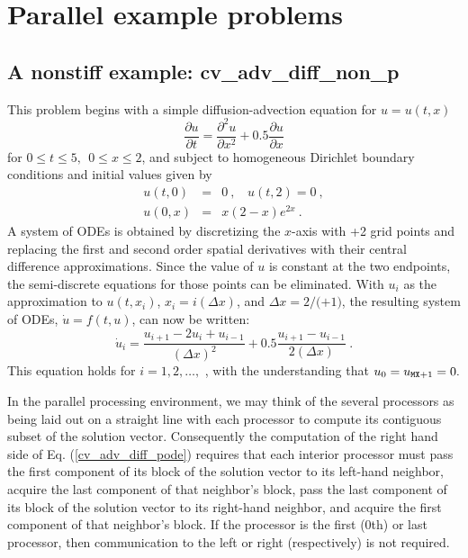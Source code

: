 \section{Parallel example problems}\label{s:ex_parallel}

\subsection{A nonstiff example: cv\_adv\_diff\_non\_p}\label{ss:cv_adv_diff_p}

This problem begins with a simple diffusion-advection equation
for $u=u(t,x)$
\begin{equation}
\frac{\partial u}{\partial t}=\frac{\partial ^{2}u}{\partial x^{2}}
   + 0.5\frac{\partial u}{\partial x}  \label{PDE1}
\end{equation}
for $0 \leq t \leq 5, ~~ 0\leq x \leq 2$, and subject to homogeneous
Dirichlet boundary conditions and initial values given by
\begin{eqnarray}
u(t,0) &=& 0 ~,~~~~u(t,2) = 0 ~, \label{BCIC1} \\
u(0,x) &=& x(2-x)e^{2x} ~. \nonumber
\end{eqnarray}
A system of  ODEs is obtained by discretizing the $x$-axis with +2
grid points and replacing the first and second order spatial derivatives
with their central difference approximations. Since the value of $u$ is
constant at the two endpoints, the semi-discrete equations for those points
can be eliminated.  With $u_{i}$ as the approximation to $u(t,x_{i})$,
$x_{i} = i(\Delta x)$, and $\Delta x = 2/($$+1)$, the resulting system of
ODEs, $\dot{u} = f(t,u)$, can now be written:
\begin{equation}
\dot{u}_i=\frac{u_{i+1}-2u_{i}+u_{i-1}}{(\Delta x)^{2}}
  + 0.5 \frac{u_{i+1}-u_{i-1}}{2(\Delta x)} ~. \label{cv_adv_diff_pode}
\end{equation}
This equation holds for $i=1,2,\ldots ,$ , with the understanding
that $u_{0} = u_{{\tt MX}+1}=0.$

In the parallel processing environment, we may think of the several
processors as being laid out on a straight line with each processor to
compute its contiguous subset of the solution vector.  Consequently
the computation of the right hand side of Eq. (\ref{cv_adv_diff_pode}) requires
that each interior processor must pass the first component of its block of
the solution vector to its left-hand neighbor, acquire the last component of
that neighbor's block, pass the last component of its block of the solution
vector to its right-hand neighbor, and acquire the first component of that
neighbor's block. If the processor is the first ($0$th) or last processor,
then communication to the left or right (respectively) is not required.

